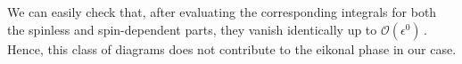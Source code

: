 We can easily check that, after evaluating the corresponding integrals for both the spinless and spin-dependent parts, they vanish identically up to $\mathcal{O}(\epsilon^0)\,.$ Hence, this class of diagrams does not contribute to the eikonal phase in our case. 
